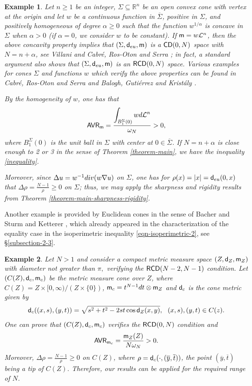 \documentclass[11pt, reqno]{amsart}
\newcommand{\ds}{\displaystyle}
\newtheorem{example}{ Example}[section]
\numberwithin{equation}{section}
\begin{document}
	\begin{example}\rm Let $n\geq 1$ be an integer,   $\Sigma\subseteq \mathbb R^n$ be an open convex cone with vertex at the origin and let $w$ be a continuous function in $\overline \Sigma$, positive in $\Sigma$, and  positively homogeneous of degree $\alpha\geq 0$ such that the function $w^{1/\alpha}$ is concave in $\Sigma$ when $\alpha>0$ (if $\alpha=0$, we consider $w$ to be constant). If ${\sf m}=w \mathcal L^n$, then the above concavity property implies that $(\Sigma, {\sf d}_{\rm eu},{\sf m})$ is a ${\sf CD}(0,N)$ space with $N=n+\alpha$, see Villani \cite{Villani} and Cabr\'e, Ros-Oton and Serra \cite[Remark 1.4]{CRS}; in fact, a standard argument also shows that $(\Sigma, {\sf d}_{\rm eu},{\sf m})$ is an	${\sf RCD}(0,N)$ space. Various examples for cones $\Sigma$ and functions $w$ which verify the above properties can be found in Cabr\'e, Ros-Oton and Serra \cite[\S 2]{CRS} and Balogh, Guti\'errez and Krist\'aly \cite[\S 4]{BGK}. 
		
		
		By the homogeneity of $w$, one has that
		$${\sf AVR}_{\sf m}=\frac{\ds\int_{B^\Sigma_1(0)}w{\rm d}\mathcal L^n }{\omega_{N}}>0,$$
		where $B^\Sigma_1(0)$ is the unit ball in $\Sigma$ with center at $0\in \overline \Sigma$. If $N=n+\alpha$ is close enough to 2 or 3 in the sense of  Theorem \ref{theorem-main}, we have the  inequality  \eqref{inequality}. 
		
		Moreover, since $\Delta u=w^{-1}{\rm div}(w \nabla u)$ on $\Sigma$, one has for $\rho(x)=|x|={\sf d}_{\rm eu}(0,x)$ that $\Delta\rho=\frac{N-1}{\rho}\geq 0$ on $\Sigma$; thus, we may apply the sharpness and rigidity results from Theorem \ref{theorem-main-sharpness-rigidity}.  
	\end{example}
		
		Another example is provided by  Euclidean cones in the sense of Bacher and
		Sturm \cite{Bacher-Sturm} and Ketterer \cite{Ketterer}, which already appeared in the characterization of the equality case in the isoperimetric  inequality \eqref{eqn-isoperimetric-2}, see \S \ref{subsection-2-3}. 
		
	
	\begin{example}\rm Let $N>1$ and consider a compact metric measure space $(Z,{\sf d}_Z,{\sf m}_Z)$ with diameter not greater than $\pi,$ verifying the 
	${\sf RCD}(N-2,N-1)$ condition. Let $(C(Z),{\sf d}_c,{\sf m}_c)$  be the metric measure cone over $Z$, where $C(Z)=Z \times [0,\infty)/(Z \times \{0\})$, ${\sf m}_c=t^{N-1}{\rm d}t\otimes {\sf m}_Z$ and ${\sf d}_c$ is the cone metric given by $${\sf d}_c((x,s),(y,t))=\sqrt{s^2+t^2-2st\cos{\sf d}_Z(x,y)},\ \ (x,s),(y,t)\in C(z).$$
		One can prove that $(C(Z),{\sf d}_c,{\sf m}_c)$ verifies the 
		${\sf RCD}(0,N)$ condition and $${\sf AVR}_{{\sf m}_c}=\frac{{\sf m}_Z(Z)}{N\omega_N}>0.$$
 Moreover, $\Delta\rho=\frac{N-1}{\rho}\geq 0$ on $C(Z)$, where $\rho={\sf d}_c(\cdot,(\overline y,\overline t))$, the point $(\overline y,\overline t)$ being a tip of $C(Z)$. Therefore, our results can be applied for the required range of $N$.  
		


	\end{example}
	
\end{document}
